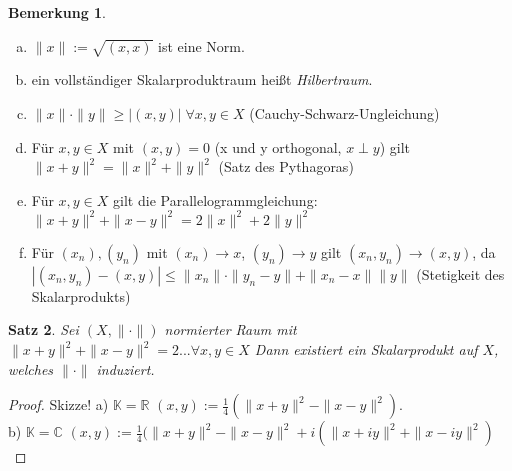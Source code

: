 \documentclass[ngerman]{report}
\theoremstyle{plain}%
\newtheorem{thm}{Satz}[chapter]
\theoremstyle{definition}%
\theoremstyle{myStyle}
\newtheorem{bem}[thm]{Bemerkung}
\newcommand{\C}{\mathbb{C}}
\newcommand{\R}{\mathbb{R}}
\newcommand{\K}{\mathbb{K}}
\newcommand{\norm}[1]{\|#1\|}
\begin{document}
	\begin{bem}
		\begin{enumerate}[a)]
			\item $\norm{x} := \sqrt{(x,x)}$ ist eine Norm.
			\item ein vollständiger Skalarproduktraum heißt \textit{Hilbertraum}.
			\item $\norm{x} \cdot \norm{y} \geq |(x,y)| \; \forall x,y \in X$ (Cauchy-Schwarz-Ungleichung)

			\item Für $x,y \in X$ mit $(x,y) = 0$ (x und y orthogonal, $x \perp y$)
			gilt $\norm{x + y}^2 = \norm{x}^2 + \norm{y}^2$ (Satz des Pythagoras)
			\item Für $x,y \in X$ gilt die Parallelogrammgleichung: 
				$\norm{x + y} ^2 + \norm{x - y}^2 = 2 \norm{x}^2 + 2\norm{y}^2$
			\item	Für $(x_n), (y_n)$ mit $(x_n) \to x$, $(y_n) \to y$ gilt 
				$(x_n, y_n) \to (x,y)$, da\\ 
				$|(x_n, y_n) - (x,y)| \leq \norm{x_n}\cdot \norm{y_n - y} + \norm{x_n - x}\norm{y}$ (Stetigkeit des Skalarprodukts)
		\end{enumerate}
	\end{bem}
	\begin{thm}
		Sei $(X,\norm{\cdot})$ normierter Raum mit $\norm{x+y}^2 + \norm{x-y}^2 = 2... \forall x,y \in X$ 
		Dann existiert ein Skalarprodukt auf $X$, welches $\norm{\cdot}$ induziert.
	\end{thm}
	\begin{proof}
		Skizze! a) $\K = \R$ $(x,y) := \frac{1}{4}(\norm{x + y}^2 - \norm{x-y}^2)$.\\ b) $\K = \C$ $(x,y) := \frac{1}{4}(\| x+y\|^2 - \|x-y\|^2 + i(\|x+iy\|^2 + \|x-iy\|^2)$
	\end{proof}
\end{document}
